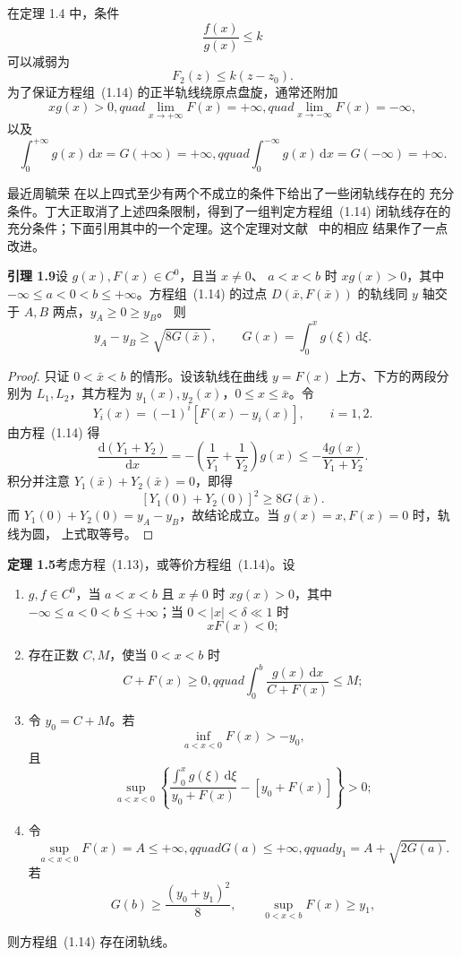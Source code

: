 
在定理 1.4 中，条件
\[
  \dfrac{f(x)}{g(x)}\leq k
\]
可以减弱为
\[
  F_2(z)\leq k(z-z_0).
\]
为了保证方程组~(1.14) 的正半轨线绕原点盘旋，通常还附加
\[
  xg(x)>0,quad
  \lim_{x\to+\infty}F(x)=+\infty,quad
  \lim_{x\to-\infty}F(x)=-\infty,
\]
以及
\[
  \int_0^{+\infty}g(x)\,\mathrm{d}x=G(+\infty)=+\infty,qquad
  \int_0^{-\infty}g(x)\,\mathrm{d}x=G(-\infty)=+\infty.
\]

最近周毓荣\cite{17} 在以上四式至少有两个不成立的条件下给出了一些闭轨线存在的
充分条件。丁大正取消了上述四条限制，得到了一组判定方程组~(1.14) 闭轨线存在的
充分条件\cite{12}；下面引用其中的一个定理。这个定理对文献~\cite{15} 中的相应
结果作了一点改进。

\noindent\textbf{引理 1.9}\quad 设 $g(x),F(x)\in C^0$，且当 $x\ne0$、
$a<x<b$ 时 $xg(x)>0$，其中 $-\infty\leq a<0<b\leq+\infty$。方程组~(1.14)
的过点 $D(\bar x,F(\bar x))$ 的轨线同 $y$ 轴交于 $A,B$ 两点，$y_A\geq0\geq y_B$。
则
\[
  y_A-y_B\geq\sqrt{8G(\bar x)},\qquad
  G(x)=\int_0^xg(\xi)\,\mathrm{d}\xi.
\]

\begin{proof}
只证 $0<\bar x<b$ 的情形。设该轨线在曲线 $y=F(x)$ 上方、下方的两段分别为
$L_1,L_2$，其方程为 $y_1(x),y_2(x)$，$0\leq x\leq\bar x$。令
\[
  Y_i(x)=(-1)^i[F(x)-y_i(x)],\qquad i=1,2.
\]
由方程~(1.14) 得
\[
  \dfrac{\mathrm{d}(Y_1+Y_2)}{\mathrm{d}x}
  =-\left(\dfrac1{Y_1}+\dfrac1{Y_2}\right)g(x)
  \leq-\dfrac{4g(x)}{Y_1+Y_2}.
\]
积分并注意 $Y_1(\bar x)+Y_2(\bar x)=0$，即得
\[
  [Y_1(0)+Y_2(0)]^2\geq8G(\bar x).
\]
而 $Y_1(0)+Y_2(0)=y_A-y_B$，故结论成立。当 $g(x)=x,F(x)=0$ 时，轨线为圆，
上式取等号。\qedhere
\end{proof}

\noindent\textbf{定理 1.5}\quad 考虑方程~(1.13)，或等价方程组~(1.14)。设
\begin{enumerate}
  \item $g,f\in C^0$，当 $a<x<b$ 且 $x\ne0$ 时 $xg(x)>0$，其中
  $-\infty\leq a<0<b\leq+\infty$；当 $0<|x|<\delta\ll1$ 时
  \[
    xF(x)<0;
  \]
  \item 存在正数 $C,M$，使当 $0<x<b$ 时
  \[
    C+F(x)\geq0,qquad
    \int_0^b\dfrac{g(x)\,\mathrm{d}x}{C+F(x)}\leq M;
  \]
  \item 令 $y_0=C+M$。若
  \[
    \inf_{a<x<0}F(x)>-y_0,
  \]
  且
  \[
    \sup_{a<x<0}\left\{
      \dfrac{\displaystyle\int_0^xg(\xi)\,\mathrm{d}\xi}{y_0+F(x)}
      -[y_0+F(x)]
    \right\}>0;
  \]
  \item 令
  \[
    \sup_{a<x<0}F(x)=A\leq+\infty,qquad
    G(a)\leq+\infty,qquad y_1=A+\sqrt{2G(a)}.
  \]
  若
  \[
    G(b)\geq\dfrac{(y_0+y_1)^2}{8},\qquad
    \sup_{0<x<b}F(x)\geq y_1,
  \]
\end{enumerate}
则方程组~(1.14) 存在闭轨线。

